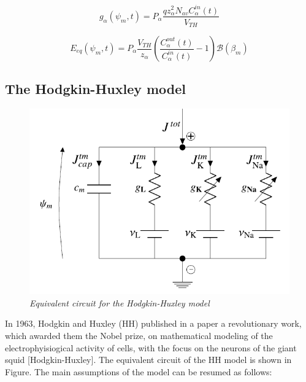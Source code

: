 \documentclass[a4paper]{article}
\begin{document}
\begin{equation}
	g_{\alpha}(\psi_m,t) = P_{\alpha}\frac{q z_{\alpha}^2N_{av}C_{\alpha}^{in}(t)}{V_{TH}} 
\end{equation}

\begin{equation}
E_{eq}(\psi_m,t) = P_{\alpha}\frac{V_{TH}}{z_{\alpha}} \left(\frac{C_{\alpha}^{out}(t)}{C_{\alpha}^{in}(t)} - 1\right)\mathcal{B}(\beta_m)
	\end{equation}
	
	
	
	\subsection{The Hodgkin-Huxley model}
	
	\begin{figure}[H]
		\begin{center}
			\includegraphics[scale=0.9]{HH.png} 
		\end{center} 
		\caption{\textit{Equivalent circuit for the Hodgkin-Huxley model}}
		
	\end{figure}


In 1963, Hodgkin and Huxley (HH) published in a paper a revolutionary work, which awarded them the Nobel prize, on mathematical modeling of the electrophyisiogical activity of cells, with the focus on the neurons of the giant squid [Hodgkin-Huxley]. The equivalent circuit of the HH model is shown in Figure. The main assumptions of the model can be resumed as follows:
\end{document}
